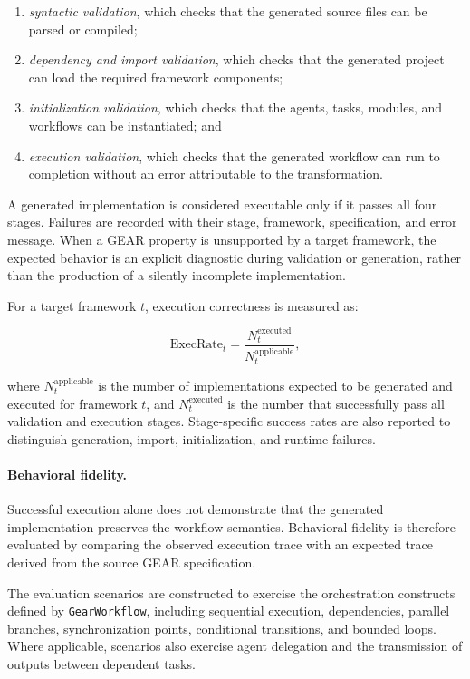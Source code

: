 \begin{enumerate}
    \item \emph{syntactic validation}, which checks that the generated source files
    can be parsed or compiled;
    \item \emph{dependency and import validation}, which checks that the generated
    project can load the required framework components;
    \item \emph{initialization validation}, which checks that the agents, tasks,
    modules, and workflows can be instantiated; and
    \item \emph{execution validation}, which checks that the generated workflow can
    run to completion without an error attributable to the transformation.
\end{enumerate}

A generated implementation is considered executable only if it passes all four
stages. Failures are recorded with their stage, framework, specification, and
error message. When a GEAR property is unsupported by a target framework, the
expected behavior is an explicit diagnostic during validation or generation,
rather than the production of a silently incomplete implementation.

For a target framework \(t\), execution correctness is measured as:

\begin{equation}
    \mathrm{ExecRate}_t =
    \frac{N^{\mathrm{executed}}_t}
         {N^{\mathrm{applicable}}_t},
\end{equation}

where \(N^{\mathrm{applicable}}_t\) is the number of implementations expected to
be generated and executed for framework \(t\), and
\(N^{\mathrm{executed}}_t\) is the number that successfully pass all validation
and execution stages. Stage-specific success rates are also reported to
distinguish generation, import, initialization, and runtime failures.

\paragraph{Behavioral fidelity.}
Successful execution alone does not demonstrate that the generated implementation
preserves the workflow semantics. Behavioral fidelity is therefore evaluated by
comparing the observed execution trace with an expected trace derived from the
source GEAR specification.

The evaluation scenarios are constructed to exercise the orchestration constructs
defined by \texttt{GearWorkflow}, including sequential execution, dependencies,
parallel branches, synchronization points, conditional transitions, and bounded
loops. Where applicable, scenarios also exercise agent delegation and the
transmission of outputs between dependent tasks.


